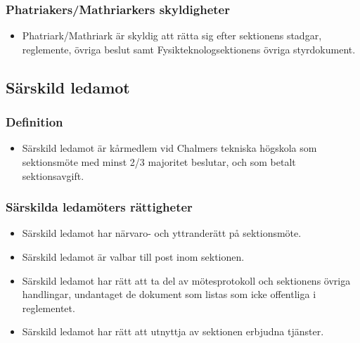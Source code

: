 \documentclass[11pt,a4paper]{article}
\begin{document}
\subsubsection{Phatriakers/Mathriarkers skyldigheter}

\begin{itemize}


\item Phatriark/Mathriark är skyldig att rätta sig efter sektionens stadgar,
   regle\-mente, övriga beslut samt  Fysikteknologsektionens övriga styrdokument.
\end{itemize}


\newpage


\subsection{Särskild ledamot}

\subsubsection{Definition}

\begin{itemize}

  \item Särskild ledamot är kårmedlem vid Chalmers tekniska högskola
  som sektionsmöte med minst 2/3 majoritet beslutar, och som betalt
  sektionsavgift.

\end{itemize}

\subsubsection{Särskilda ledamöters rättigheter}

\begin{itemize}

   \item Särskild ledamot har närvaro- och yttranderätt på
   sektionsmöte.

   \item Särskild ledamot är valbar till post inom sektionen.

   \item Särskild ledamot har rätt att ta del av mötesprotokoll och
   sektionens övriga handlingar, undantaget de dokument som listas som icke offentliga i reglementet.

   \item Särskild ledamot har rätt att utnyttja av sektionen erbjudna
   tjänster.

\end{itemize}
\end{document}
